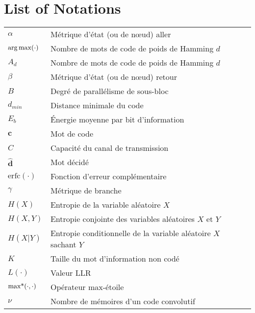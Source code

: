 \chapter*{List of Notations}
\begin{center}

\begin{longtable}{ p{}  p{} }

$\alpha$       			&	Métrique d'état (ou de nœud) aller 				  										\\
$\operatorname*{arg\,max}(\cdot)$       	&	Nombre de mots de code de poids de Hamming $d$  										\\
$A_d$       	 		&	Nombre de mots de code de poids de Hamming $d$  										\\
$\beta$       			&	Métrique d'état (ou de nœud) retour				  										\\
$B$       	        	&   Degré de parallélisme de sous-bloc    													\\
$d_{min}$    	 		&	Distance minimale du code        														\\
$E_b$         	 		&	Énergie moyenne par bit d'information     												\\
$\mathbf{c}$			& 	Mot de code 																			\\
$C$						& 	Capacité du canal de transmission														\\
$\mathbf{\hat{d}}$		&	Mot décidé																				\\
$\text{erfc}(\cdot)$    &	Fonction d'erreur complémentaire     													\\
$\gamma$       			&	Métrique de branche				 				  										\\
$H(X)$					& 	Entropie de la variable aléatoire $X$													\\
$H(X,Y)$				& 	Entropie conjointe des variables aléatoires $X$ et $Y$									\\
$H(X|Y)$				& 	Entropie conditionnelle de la variable aléatoire $X$ sachant $Y$						\\
$K$     	  			&	Taille du mot d'information non codé     												\\
$L(\cdot)$				&	Valeur LLR 																				\\
$\operatorname*{max*}(\cdot,\cdot)$ & 	Opérateur max-étoile																	\\
$\nu$					& 	Nombre de mémoires d'un code convolutif													\\

\end{longtable}
\end{center}
